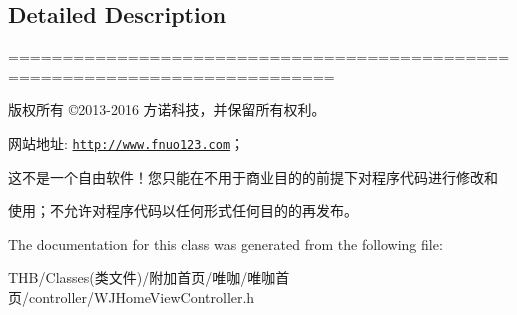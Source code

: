 \subsection{Detailed Description}
============================================================================

版权所有 ©2013-\/2016 方诺科技，并保留所有权利。

网站地址\+: \href{http://www.fnuo123.com}{\tt http\+://www.\+fnuo123.\+com}； 



这不是一个自由软件！您只能在不用于商业目的的前提下对程序代码进行修改和

使用；不允许对程序代码以任何形式任何目的的再发布。 

 

The documentation for this class was generated from the following file\+:\begin{DoxyCompactItemize}
\item 
T\+H\+B/\+Classes(类文件)/附加首页/唯咖/唯咖首页/controller/W\+J\+Home\+View\+Controller.\+h\end{DoxyCompactItemize}
